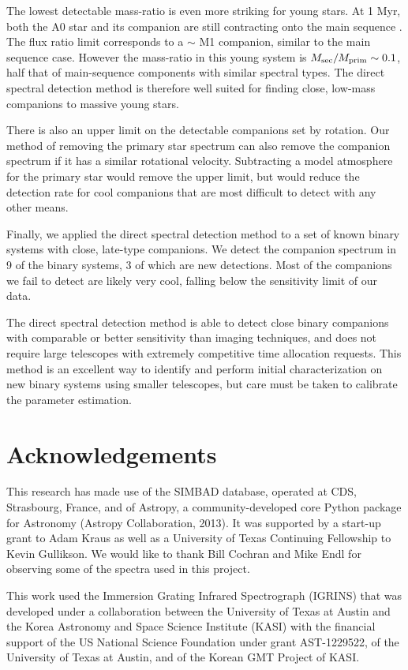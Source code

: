 \documentclass{emulateapj}
\begin{document}
The lowest detectable mass-ratio is even more striking for young stars. At 1 Myr, both the A0 star and its companion are still contracting onto the main sequence \citep{Bressan2012}. The flux ratio limit corresponds to a $\sim$ M1 companion, similar to the main sequence case. However the mass-ratio in this young system is $M_{\rm  sec}/M_{\rm prim} \sim 0.1$, half that of main-sequence components with similar spectral types. The direct spectral detection method is therefore well suited for finding close, low-mass companions to massive young stars.

There is also an upper limit on the detectable companions set by rotation. Our method of removing the primary star spectrum can also remove the companion spectrum if it has a similar rotational velocity. Subtracting a model atmosphere for the primary star would remove the upper limit, but would reduce the detection rate for cool companions that are most difficult to detect with any other means.

Finally, we applied the direct spectral detection method to a set of known binary systems with close, late-type companions. We detect the companion spectrum in 9 of the binary systems, 3 of which are new detections. Most of the companions we fail to detect are likely very cool, falling below the sensitivity limit of our data.

The direct spectral detection method is able to detect close binary companions with comparable or better sensitivity than imaging techniques, and does not require large telescopes with extremely competitive time allocation requests. This method is an excellent way to identify and perform initial characterization on new binary systems using smaller telescopes, but care must be taken to calibrate the parameter estimation. 

\section*{Acknowledgements}
This research has made use of the SIMBAD database, operated at CDS, Strasbourg, France, and of Astropy, a community-developed core Python package for Astronomy (Astropy Collaboration, 2013).
It was supported by a start-up grant to Adam Kraus as well as a University of Texas Continuing Fellowship to Kevin Gullikson. We would like to thank Bill Cochran and Mike Endl for observing some of the spectra used in this project. 

This work used the Immersion Grating Infrared Spectrograph (IGRINS) that was developed under a collaboration between the University of Texas at Austin and the Korea Astronomy and Space Science Institute (KASI) with the financial support of the US National Science Foundation under grant AST-1229522, of the University of Texas at Austin, and of the Korean GMT Project of KASI.
\end{document}
